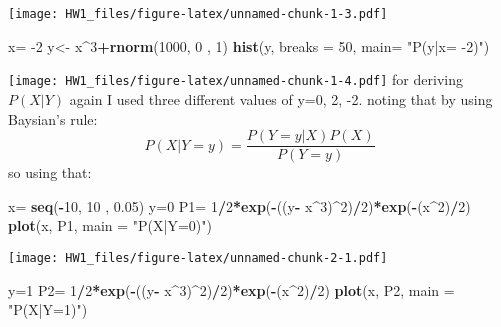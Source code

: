 \documentclass[]{article}
\newenvironment{Shaded}{\begin{snugshade}}{\end{snugshade}}
\newcommand{\DataTypeTok}[1]{\textcolor[rgb]{0.13,0.29,0.53}{#1}}
\newcommand{\DecValTok}[1]{\textcolor[rgb]{0.00,0.00,0.81}{#1}}
\newcommand{\FloatTok}[1]{\textcolor[rgb]{0.00,0.00,0.81}{#1}}
\newcommand{\KeywordTok}[1]{\textcolor[rgb]{0.13,0.29,0.53}{\textbf{#1}}}
\newcommand{\NormalTok}[1]{#1}
\newcommand{\OperatorTok}[1]{\textcolor[rgb]{0.81,0.36,0.00}{\textbf{#1}}}
\newcommand{\StringTok}[1]{\textcolor[rgb]{0.31,0.60,0.02}{#1}}
\begin{document}
\texttt{[image: HW1\_files/figure-latex/unnamed-chunk-1-3.pdf]}

\begin{Shaded}
\begin{Highlighting}[]
\NormalTok{x=}\StringTok{ }\DecValTok{-2}
\NormalTok{y<-}\StringTok{ }\NormalTok{x}\OperatorTok{^}\DecValTok{3}\OperatorTok{+}\KeywordTok{rnorm}\NormalTok{(}\DecValTok{1000}\NormalTok{, }\DecValTok{0}\NormalTok{ , }\DecValTok{1}\NormalTok{)}
\KeywordTok{hist}\NormalTok{(y, }\DataTypeTok{breaks =}  \DecValTok{50}\NormalTok{, }\DataTypeTok{main=} \StringTok{"P(y|x= -2)"}\NormalTok{)}
\end{Highlighting}
\end{Shaded}

\texttt{[image: HW1\_files/figure-latex/unnamed-chunk-1-4.pdf]} for
deriving \(P(X|Y)\) again I used three different values of y=0, 2, -2.
noting that by using Baysian's rule:
\[P(X|Y=y)= \frac{P(Y=y|X)P(X)}{P(Y=y)}\] so using that:

\begin{Shaded}
\begin{Highlighting}[]
\NormalTok{x=}\StringTok{ }\KeywordTok{seq}\NormalTok{(}\OperatorTok{-}\DecValTok{10}\NormalTok{, }\DecValTok{10}\NormalTok{ , }\FloatTok{0.05}\NormalTok{)}
\NormalTok{y=}\DecValTok{0}
\NormalTok{P1=}\StringTok{ }\DecValTok{1}\OperatorTok{/}\DecValTok{2}\OperatorTok{*}\KeywordTok{exp}\NormalTok{(}\OperatorTok{-}\NormalTok{((y}\OperatorTok{-}\StringTok{ }\NormalTok{x}\OperatorTok{^}\DecValTok{3}\NormalTok{)}\OperatorTok{^}\DecValTok{2}\NormalTok{)}\OperatorTok{/}\DecValTok{2}\NormalTok{)}\OperatorTok{*}\KeywordTok{exp}\NormalTok{(}\OperatorTok{-}\NormalTok{(x}\OperatorTok{^}\DecValTok{2}\NormalTok{)}\OperatorTok{/}\DecValTok{2}\NormalTok{)}
\KeywordTok{plot}\NormalTok{(x, P1, }\DataTypeTok{main =} \StringTok{"P(X|Y=0)"}\NormalTok{)}
\end{Highlighting}
\end{Shaded}

\texttt{[image: HW1\_files/figure-latex/unnamed-chunk-2-1.pdf]}

\begin{Shaded}
\begin{Highlighting}[]
\NormalTok{y=}\DecValTok{1}
\NormalTok{P2=}\StringTok{ }\DecValTok{1}\OperatorTok{/}\DecValTok{2}\OperatorTok{*}\KeywordTok{exp}\NormalTok{(}\OperatorTok{-}\NormalTok{((y}\OperatorTok{-}\StringTok{ }\NormalTok{x}\OperatorTok{^}\DecValTok{3}\NormalTok{)}\OperatorTok{^}\DecValTok{2}\NormalTok{)}\OperatorTok{/}\DecValTok{2}\NormalTok{)}\OperatorTok{*}\KeywordTok{exp}\NormalTok{(}\OperatorTok{-}\NormalTok{(x}\OperatorTok{^}\DecValTok{2}\NormalTok{)}\OperatorTok{/}\DecValTok{2}\NormalTok{)}
\KeywordTok{plot}\NormalTok{(x, P2, }\DataTypeTok{main =} \StringTok{"P(X|Y=1)"}\NormalTok{)}
\end{Highlighting}
\end{Shaded}
\end{document}
